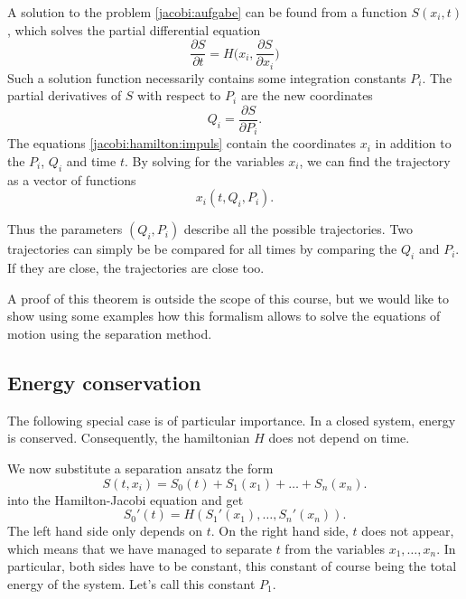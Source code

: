 \begin{satz}
\label{jacobi:satz}
A solution to the problem \eqref{jacobi:aufgabe} can be found from 
a function $S(x_i, t)$, which solves the partial differential equation
\begin{equation}
\frac{\partial S}{\partial t}
=
H\biggl(
x_i,
\frac{\partial S}{\partial x_i}
\biggr)
\label{jacobi:hamilton:dgl}
\end{equation}
Such a solution function necessarily contains some integration constants
$P_i$.
The partial derivatives of $S$ with respect to $P_i$ are the new coordinates
\begin{equation}
Q_i=\frac{\partial S}{\partial P_i}.
\label{jacobi:hamilton:impuls}
\end{equation}
The equations \eqref{jacobi:hamilton:impuls} contain the coordinates 
$x_i$ in addition to the $P_i$, $Q_i$ and time $t$.
By solving for the variables $x_i$, we can find the trajectory as 
a vector of functions
\[
x_i(t,Q_i,P_i).
\]
\end{satz}
Thus the parameters $(Q_i,P_i)$
describe all the possible trajectories.
Two trajectories can simply be be compared for all times by comparing the
$Q_i$ and $P_i$.
If they are close, the trajectories are close too.

A proof of this theorem is outside the scope of this course, but we
would like to show using some examples how this formalism allows to
solve the equations of motion using the separation method.

\subsection{Energy conservation}
The following special case is of particular importance.
In a closed system, energy is conserved.
Consequently, the hamiltonian $H$ does not depend on time.

We now substitute a separation ansatz the form
\[
S(t,x_i)=S_0(t)+S_1(x_1)+\dots+S_n(x_n).
\]
into the Hamilton-Jacobi equation and get
\[
S_0'(t)=H(S_1'(x_1),\dots, S_n'(x_n)).
\]
The left hand side only depends on $t$.
On the right hand side, $t$ does not appear, which means that we have
managed to separate $t$ from the variables $x_1,\dots,x_n$.
In particular, both sides have to be constant, this constant
of course being the total energy of the system.
Let's call this constant $P_1$.

